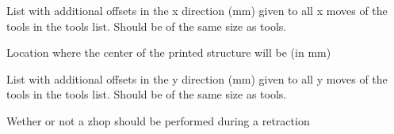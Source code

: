 \documentclass[letterpaper,10pt,english]{sphinxmanual}
\begin{document}
\begin{fulllineitems}

\begin{fulllineitems}
\label{\detokenize{index:generator.generator.x_offsets}}
\sphinxAtStartPar
List with additional offsets in the x direction (mm) given to all x moves of the tools in the tools list. Should be of the same size as tools.

\end{fulllineitems}


\begin{fulllineitems}
\label{\detokenize{index:generator.generator.y_center}}
\sphinxAtStartPar
Location where the center of the printed structure will be (in mm)

\end{fulllineitems}


\begin{fulllineitems}
\label{\detokenize{index:generator.generator.y_offsets}}
\sphinxAtStartPar
List with additional offsets in the y direction (mm) given to all y moves of the tools in the tools list. Should be of the same size as tools.

\end{fulllineitems}


\begin{fulllineitems}
\label{\detokenize{index:generator.generator.z_hop}}
\sphinxAtStartPar
Wether or not a z\sphinxhyphen{}hop should be performed during a retraction


\end{fulllineitems}
\end{fulllineitems}
\end{document}
